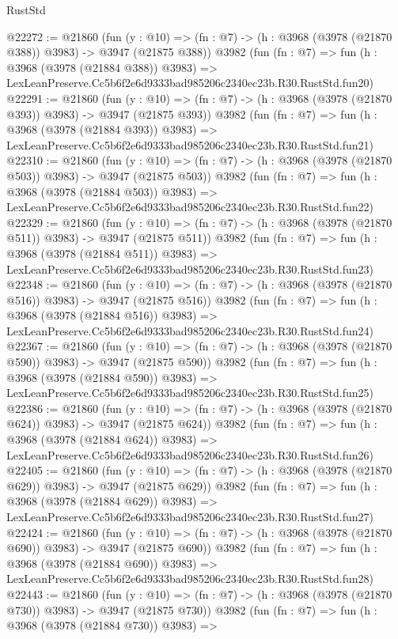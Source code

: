 \begin{lexlean}{RustStd}
\begin{coremodule}
@22272 := @21860
    (fun (y : @10) => (fn : @7) -> (h : @3968 (@3978 (@21870 @388)) @3983) -> @3947 (@21875 @388))
    @3982
    (fun (fn : @7) =>
    fun (h : @3968 (@3978 (@21884 @388)) @3983) =>
    LexLeanPreserve.Cc5b6f2e6d9333bad985206c2340ec23b.R30.RustStd.fun20)
@22291 := @21860
    (fun (y : @10) => (fn : @7) -> (h : @3968 (@3978 (@21870 @393)) @3983) -> @3947 (@21875 @393))
    @3982
    (fun (fn : @7) =>
    fun (h : @3968 (@3978 (@21884 @393)) @3983) =>
    LexLeanPreserve.Cc5b6f2e6d9333bad985206c2340ec23b.R30.RustStd.fun21)
@22310 := @21860
    (fun (y : @10) => (fn : @7) -> (h : @3968 (@3978 (@21870 @503)) @3983) -> @3947 (@21875 @503))
    @3982
    (fun (fn : @7) =>
    fun (h : @3968 (@3978 (@21884 @503)) @3983) =>
    LexLeanPreserve.Cc5b6f2e6d9333bad985206c2340ec23b.R30.RustStd.fun22)
@22329 := @21860
    (fun (y : @10) => (fn : @7) -> (h : @3968 (@3978 (@21870 @511)) @3983) -> @3947 (@21875 @511))
    @3982
    (fun (fn : @7) =>
    fun (h : @3968 (@3978 (@21884 @511)) @3983) =>
    LexLeanPreserve.Cc5b6f2e6d9333bad985206c2340ec23b.R30.RustStd.fun23)
@22348 := @21860
    (fun (y : @10) => (fn : @7) -> (h : @3968 (@3978 (@21870 @516)) @3983) -> @3947 (@21875 @516))
    @3982
    (fun (fn : @7) =>
    fun (h : @3968 (@3978 (@21884 @516)) @3983) =>
    LexLeanPreserve.Cc5b6f2e6d9333bad985206c2340ec23b.R30.RustStd.fun24)
@22367 := @21860
    (fun (y : @10) => (fn : @7) -> (h : @3968 (@3978 (@21870 @590)) @3983) -> @3947 (@21875 @590))
    @3982
    (fun (fn : @7) =>
    fun (h : @3968 (@3978 (@21884 @590)) @3983) =>
    LexLeanPreserve.Cc5b6f2e6d9333bad985206c2340ec23b.R30.RustStd.fun25)
@22386 := @21860
    (fun (y : @10) => (fn : @7) -> (h : @3968 (@3978 (@21870 @624)) @3983) -> @3947 (@21875 @624))
    @3982
    (fun (fn : @7) =>
    fun (h : @3968 (@3978 (@21884 @624)) @3983) =>
    LexLeanPreserve.Cc5b6f2e6d9333bad985206c2340ec23b.R30.RustStd.fun26)
@22405 := @21860
    (fun (y : @10) => (fn : @7) -> (h : @3968 (@3978 (@21870 @629)) @3983) -> @3947 (@21875 @629))
    @3982
    (fun (fn : @7) =>
    fun (h : @3968 (@3978 (@21884 @629)) @3983) =>
    LexLeanPreserve.Cc5b6f2e6d9333bad985206c2340ec23b.R30.RustStd.fun27)
@22424 := @21860
    (fun (y : @10) => (fn : @7) -> (h : @3968 (@3978 (@21870 @690)) @3983) -> @3947 (@21875 @690))
    @3982
    (fun (fn : @7) =>
    fun (h : @3968 (@3978 (@21884 @690)) @3983) =>
    LexLeanPreserve.Cc5b6f2e6d9333bad985206c2340ec23b.R30.RustStd.fun28)
@22443 := @21860
    (fun (y : @10) => (fn : @7) -> (h : @3968 (@3978 (@21870 @730)) @3983) -> @3947 (@21875 @730))
    @3982
    (fun (fn : @7) =>
    fun (h : @3968 (@3978 (@21884 @730)) @3983) =>

\end{coremodule}
\end{lexlean}
